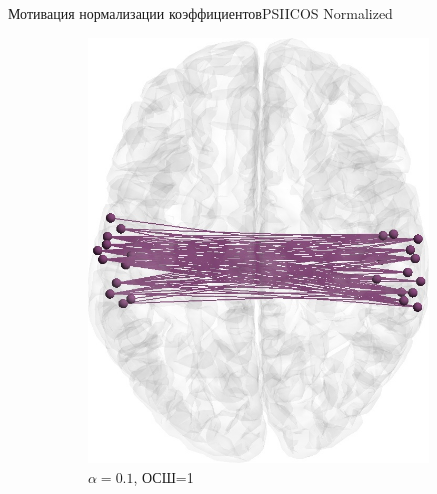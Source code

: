 \documentclass[12pt]{beamer}
\begin{document}
\begin{frame}[t]{Мотивация нормализации коэффициентов}{PSIICOS Normalized}
\begin{figure}[htbp]
\begin{subfigure}[t]{0.24\textwidth}
            \includegraphics[width=0.99\textwidth]{../images/loreta_brain_jitter_01_snr_1_phase_lag_07854.jpg}
            \caption{\tiny $\alpha=0.1$, ОСШ=1}\label{fig:unbiased_1_ntw_c}
        \end{subfigure}
        \begin{subfigure}[t]{0.235\textwidth}

\end{subfigure}
\end{figure}
\end{frame}
\end{document}

